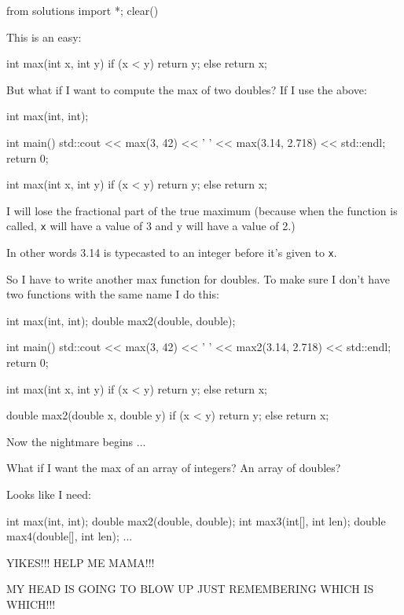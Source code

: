 \begin{python0}
from solutions import *; clear()
\end{python0}

This is an easy:

\begin{consolethree}[escapeinside=||]
int max(int x, int y)
{
    if (x < y) return y;
    else return x;
}
\end{consolethree}

But what if I want to compute the max of two doubles? If I use the
above:

\begin{consolethree}[escapeinside=||]
int max(int, int);

int main()
{
    std::cout << max(3, 42) << ' '
              << max(3.14, 2.718) << std::endl;
    return 0;
}

int max(int x, int y)
{
    if (x < y) return y;
    else return x;
}
\end{consolethree}

I will lose the fractional part of the true maximum (because when the function is called, \texttt{x} will have a value of 3 and y will have a value of 2.)

In other words 3.14 is typecasted to an integer before it's given to \texttt{x}.

So I have to write another max function for doubles. To make sure I don't have two functions with the same name I do this:

\begin{consolethree}[escapeinside=||]
int max(int, int);
double max2(double, double);

int main()
{
    std::cout << max(3, 42) << ' '
              << max2(3.14, 2.718) << std::endl;
    return 0;
}

int max(int x, int y)
{
    if (x < y) return y;
    else return x;
}

double max2(double x, double y)
{
    if (x < y) return y;
    else return x;
}
\end{consolethree}

Now the nightmare begins ...

What if I want the max of an array of integers? An array of doubles?

Looks like I need:

\begin{consolethree}[escapeinside=||]
int max(int, int);
double max2(double, double);
int max3(int[], int len);
double max4(double[], int len);
...
\end{consolethree}

YIKES!!! HELP ME MAMA!!!

MY HEAD IS GOING TO BLOW UP JUST REMEMBERING WHICH IS WHICH!!!


